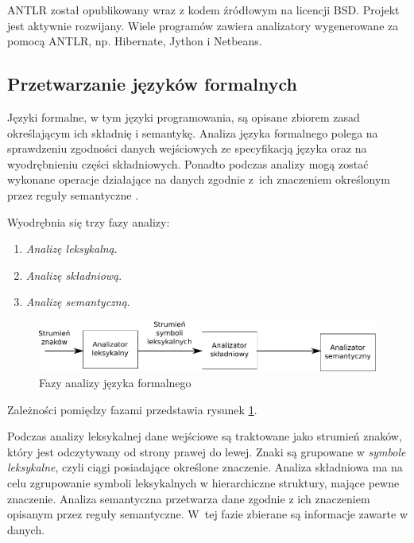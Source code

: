 ANTLR został opublikowany wraz z kodem źródłowym na licencji BSD. Projekt jest
aktywnie rozwijany. Wiele programów zawiera analizatory wygenerowane za pomocą
ANTLR, np. Hibernate, Jython i Netbeans.

\subsection{Przetwarzanie języków formalnych}
Języki formalne, w tym języki programowania, są opisane zbiorem zasad określającym
ich składnię i semantykę. Analiza języka formalnego polega na sprawdzeniu zgodności
danych wejściowych ze specyfikacją języka oraz na wyodrębnieniu części składniowych.
Ponadto podczas analizy mogą zostać wykonane operacje działające na danych zgodnie
z~ich znaczeniem określonym przez reguły semantyczne \cite{compilers}.

Wyodrębnia się trzy fazy analizy:
\begin{enumerate}
\item \emph{Analizę leksykalną}.
\item \emph{Analizę składniową}.
\item \emph{Analizę semantyczną}.
\end{enumerate}

\begin{figure}[h]
  \centering
    \includegraphics[width=\textwidth]{img/antlr_phases.pdf}
    \caption{Fazy analizy języka formalnego}
    \label{antlr_phases}
\end{figure}

Zależności pomiędzy fazami przedstawia rysunek \ref{antlr_phases}. 

Podczas analizy leksykalnej dane wejściowe są traktowane jako strumień znaków, który
jest odczytywany od strony prawej do lewej. Znaki są grupowane w \emph{symbole leksykalne}, czyli
ciągi posiadające określone znaczenie. Analiza składniowa ma na celu zgrupowanie 
symboli leksykalnych w hierarchiczne struktury,
mające pewne znaczenie. Analiza semantyczna przetwarza dane zgodnie z ich znaczeniem
opisanym przez reguły semantyczne. W~tej fazie zbierane są informacje zawarte w danych.

